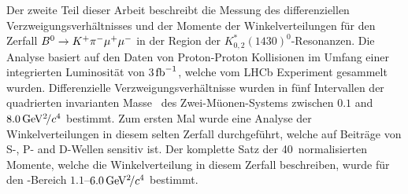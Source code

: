 Der zweite Teil dieser Arbeit beschreibt die Messung des differenziellen
Verzweigungsverh{\"a}ltnisses und der Momente der Winkelverteilungen f{\"u}r
den Zerfall ${B}^{0} \rightarrow K^{+}\pi^{-}\mu^{+}\mu^{-}$ in der Region der
$K^{*}_{0,2}(1430)^{0}$-Resonanzen. Die Analyse basiert auf den Daten von
Proton-Proton Kollisionen im Umfang einer integrierten Luminosit{\"a}t von
3$\mbox{\,fb}^{-1}$, welche vom LHCb Experiment gesammelt wurden.
Differenzielle Verzweigungsverh{\"a}ltnisse wurden in f{\"u}nf Intervallen der
quadrierten invarianten Masse \qsq\ des Zwei-M{\"u}onen-Systems zwischen $0.1$
and $8.0{\mathrm{\,Ge\kern -0.1em V^2\!/}c^4}$ bestimmt. Zum ersten Mal wurde
eine Analyse der Winkelverteilungen in diesem selten Zerfall durchgef{\"u}hrt,
welche auf Beitr{\"a}ge von S-, P- and D-Wellen sensitiv ist. Der komplette
Satz der 40~normalisierten Momente, welche die Winkelverteilung in diesem
Zerfall beschreiben, wurde f{\"u}r den \qsq-Bereich
$1.1$--$6.0{\mathrm{\,Ge\kern -0.1em V^2\!/}c^4}$ bestimmt.